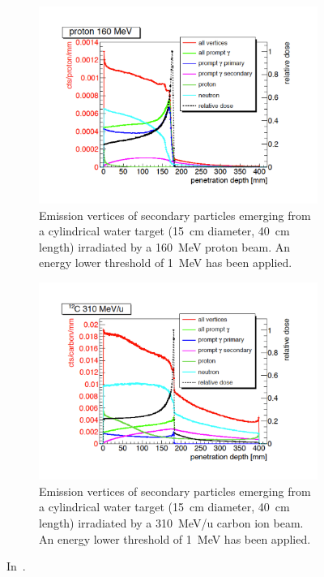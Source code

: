 \begin{figure}
\centering
\begin{subfigure}[t]{.49\textwidth}
\includegraphics[width=1.2\linewidth]{03_GraphicFiles/chapter2_GammaCameras/PG_secPartDistr_p.pdf}
\caption{Emission vertices of secondary particles emerging from a cylindrical water target (15~cm diameter, 40~cm length) irradiated by a 160~MeV proton beam. An energy lower threshold of 1~MeV has been applied.}
\label{chap2::fig::PGsecDistrp}
\end{subfigure}
\begin{subfigure}[t]{.49\textwidth}
\includegraphics[width=1.2\linewidth]{03_GraphicFiles/chapter2_GammaCameras/PG_secPartDistr_C.pdf}
\caption{Emission vertices of secondary particles emerging from a cylindrical water target (15~cm diameter, 40~cm length) irradiated by a 310~MeV/u carbon ion beam. An energy lower threshold of 1~MeV has been applied.}
\label{chap2::fig::PGsecDistrC}
\end{subfigure}
\caption{In~\cite{Krimmer2017}.}
\label{chap2::fig::PGsecDistr_gen}
\end{figure}


